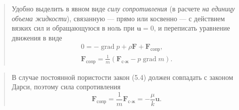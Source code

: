 \documentclass[12pt,a4paper]{article}
\DeclareMathOperator{\grad}{grad}
\newenvironment{textquote}{\begin{quote}\sloppy}{\end{quote}}
\begin{document}
\begin{textquote}
Удобно выделить в явном виде \textit{силу сопротивления} (в расчете \textit{на единицу объема жидкости}), связанную --- прямо или косвенно --- с действием вязких сил и обращающуюся в ноль при $\boldsymbol{u}=0$, и переписать уравнение движения в виде
\begin{equation}
\begin{gathered}
0=-\grad p+\rho\boldsymbol{F}+\boldsymbol{F}_{\text{сопр}},\\
\boldsymbol{F}_{\text{сопр}}=\frac{1}{m}(\boldsymbol{F}_{\text{с-ж}}-p\grad m).
\end{gathered}
\tag{5.4}\label{q3:eq-5-4}
\end{equation}
\end{textquote}

\begin{textquote}
В случае постоянной пористости закон (5.4) должен совпадать с законом Дарси, поэтому сила сопротивления
\[
\boldsymbol{F}_{\text{сопр}}=\frac{1}{m}\boldsymbol{F}_{\text{с-ж}}=-\frac{\mu}{k}\boldsymbol{u}.
\]
\end{textquote}
\end{document}
